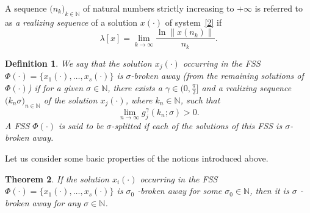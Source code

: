 \documentclass[11pt]{article}
\newtheorem{theorem}{Theorem}[section]
\newtheorem{definition}[theorem]{Definition}
\begin{document}
A sequence $\bigl(n_{k}\bigr)_{k\in \mathbb{N}}$ of natural numbers strictly
increasing to $+\infty $ is referred to as 
\emph{a realizing sequence}
of a solution $x(\cdot )$ of system~\eqref{2} if 
\begin{equation*}
\lambda [x]=\lim_{k\to \infty }\frac{\ln \|x(n_{k})\|}{n_{k}}.
\end{equation*}

\begin{definition}
\label{ras4l} \textrm{We say that the solution $x_{j}(\cdot )$ occurring in
the FSS $\Phi (\cdot )=\bigl\{x_{1}(\cdot ),\dots ,x_{s}(\cdot )\bigr\}$ is 
\emph{$\sigma $-broken away} (from the remaining solutions of $\Phi (
\cdot ) $) if for a given $\sigma \in \mathbb{N}$, there exists a $%
\gamma \in \bigl(0,\frac{\pi }{2}\bigr]$ and a realizing sequence 
$\bigl(k_{n}\sigma \bigr)_{n\in \mathbb{N}}$ of the solution $x_j(\cdot)$, where 
$k_{n}\in \mathbb{N}$, such that 
\begin{equation*}
\lim_{n\to \infty }g_{j}^{\gamma }( k_{n};\sigma ) >0.
\end{equation*}%
A FSS $\Phi (\cdot )$ is said to be \emph{$\sigma $-splitted} if each of
the solutions of this FSS is $\sigma $-broken away. }
\end{definition}

Let us consider some basic properties of the 
notions introduced above.

\begin{theorem}
\label{Tw1}
\it 
If the solution $x_{i}(\cdot )$ occurring in the FSS $\Phi
(\cdot )=\bigl\{x_{1}(\cdot ),\dots ,x_{s}(\cdot )\bigr\}$ is $\sigma _{0}$%
-broken away for some $\sigma _{0}\in \mathbb{N}$, then it is $\sigma $%
-broken away for any $\sigma \in \mathbb{N}$.
\end{theorem}
\end{document}
